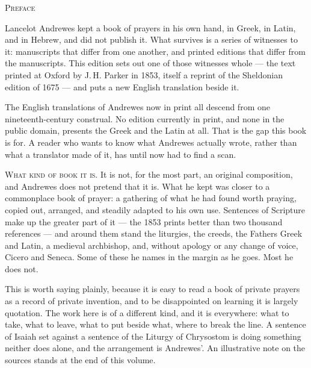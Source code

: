 \begingroup
\setlength{\parskip}{0.55\baselineskip}
\setlength{\parindent}{0pt}
{\centering\Large\scshape Preface\par}
\vspace{1.5\baselineskip}

Lancelot Andrewes kept a book of prayers in his own hand, in Greek, in Latin, and
in Hebrew, and did not publish it. What survives is a series of witnesses to it:
manuscripts that differ from one another, and printed editions that differ from
the manuscripts. This edition sets out one of those witnesses whole --- the text
printed at Oxford by J.\,H. Parker in 1853, itself a reprint of the Sheldonian
edition of 1675 --- and puts a new English translation beside it.

The English translations of Andrewes now in print all descend from one
nineteenth-century construal. No edition currently in print, and none in the
public domain, presents the Greek and the Latin at all. That is the gap this book
is for. A reader who wants to know what Andrewes actually wrote, rather than what
a translator made of it, has until now had to find a scan.

\vspace{0.8\baselineskip}
{\scshape What kind of book it is.}\quad
It is not, for the most part, an original composition, and Andrewes does not
pretend that it is. What he kept was closer to a commonplace book of prayer: a
gathering of what he had found worth praying, copied out, arranged, and steadily
adapted to his own use. Sentences of Scripture make up the greater part of it ---
the 1853 prints better than two thousand references --- and around them stand the
liturgies, the creeds, the Fathers Greek and Latin, a medieval archbishop, and,
without apology or any change of voice, Cicero and Seneca. Some of these he names
in the margin as he goes. Most he does not.

This is worth saying plainly, because it is easy to read a book of private
prayers as a record of private invention, and to be disappointed on learning it is
largely quotation. The work here is of a different kind, and it is everywhere:
what to take, what to leave, what to put beside what, where to break the line. A
sentence of Isaiah set against a sentence of the Liturgy of Chrysostom is doing
something neither does alone, and the arrangement is Andrewes'. An illustrative
note on the sources stands at the end of this volume.

